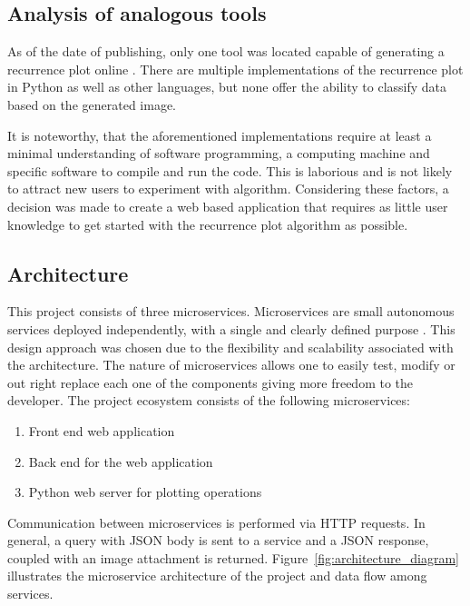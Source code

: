 \documentclass[a4paper,12pt,fleqn]{article}
\begin{document}
\subsection{Analysis of analogous tools}
As of the date of publishing, only one tool was located capable
of generating a recurrence plot online \cite{recurrence_plot_tk}.
There are multiple implementations of the recurrence plot in Python as well as other
languages, but none offer the ability to classify data based on the generated image.

It is noteworthy, that the aforementioned implementations require at least a minimal understanding of software programming, a computing machine and specific software to compile and run the code.
This is laborious and is not likely to attract new users to experiment with algorithm.
Considering these factors, a decision was made to create a web based application that requires
as little user knowledge to get started with the recurrence plot algorithm as possible.


\subsection{Architecture}
This project consists of three microservices.
Microservices are small autonomous services deployed independently, with a single and clearly defined purpose \cite{krause2015microservices}. This design approach was chosen due to the flexibility and scalability associated with the architecture. %
The nature of microservices allows one to easily test, modify or out right replace each one of the components giving more freedom to the developer.
The project ecosystem consists of the following microservices:
\begin{enumerate}
  \item Front end web application
  \item Back end for the web application
  \item Python web server for plotting operations
\end{enumerate}

Communication between microservices is performed via HTTP requests. In general, a query with JSON body is sent to a service and a JSON response, coupled with an image attachment is returned.
Figure~\ref{fig:architecture_diagram} illustrates the microservice architecture of the project and data flow among services.
\end{document}
